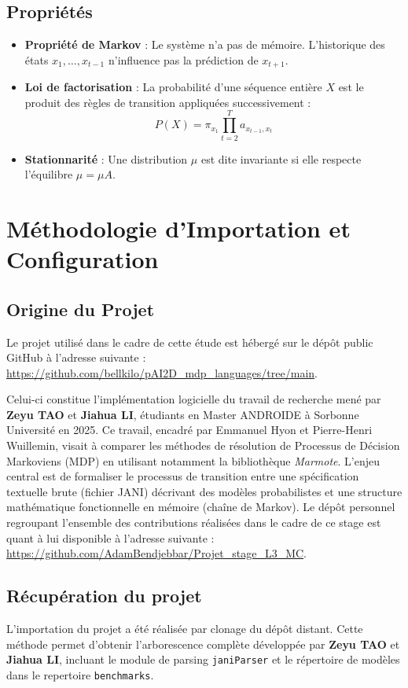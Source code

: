 \documentclass[14pt, a4paper]{extarticle}
\begin{document}
\subsection{Propriétés }
\begin{itemize}
    \item \textbf{Propriété de Markov} : Le système n'a pas de mémoire. L'historique des états $x_1, \dots, x_{t-1}$ n'influence pas la prédiction de $x_{t+1}$.
    \item \textbf{Loi de factorisation} : La probabilité d'une séquence entière $X$ est le produit des règles de transition appliquées successivement :
    \begin{equation}
        P(X) = \pi_{x_{1}}\prod_{t=2}^{T}a_{x_{t-1},x_{t}} \text{}
    \end{equation}
    \item \textbf{Stationnarité} : Une distribution $\mu$ est dite invariante si elle respecte l'équilibre $\mu = \mu A$.
\end{itemize}


\section{Méthodologie d'Importation et Configuration}

\subsection{Origine du Projet}
Le projet utilisé dans le cadre de cette étude est hébergé sur le dépôt public GitHub à l'adresse suivante : \url{https://github.com/bellkilo/pAI2D_mdp_languages/tree/main}.

Celui-ci constitue l'implémentation logicielle du travail de recherche mené par \textbf{Zeyu TAO} et \textbf{Jiahua LI}, étudiants en Master ANDROIDE à Sorbonne Université en 2025. Ce travail, encadré par Emmanuel Hyon et Pierre-Henri Wuillemin, visait à comparer les méthodes de résolution de Processus de Décision Markoviens (MDP) en utilisant notamment la bibliothèque \textit{Marmote}.
L'enjeu central est de formaliser le processus de transition entre une spécification textuelle brute (fichier JANI) décrivant des modèles probabilistes et une structure mathématique fonctionnelle en mémoire (chaîne de Markov). Le dépôt personnel regroupant l'ensemble des contributions réalisées dans le cadre de ce stage est quant à lui disponible à l'adresse suivante : \url{https://github.com/AdamBendjebbar/Projet_stage_L3_MC}.
\subsection{Récupération du projet}
L'importation du projet a été réalisée par clonage du dépôt distant. Cette méthode permet d'obtenir l'arborescence complète développée par \textbf{Zeyu TAO} et \textbf{Jiahua LI}, incluant le module de parsing \texttt{janiParser} et le répertoire de modèles dans le repertoire \texttt{benchmarks}.
\end{document}
